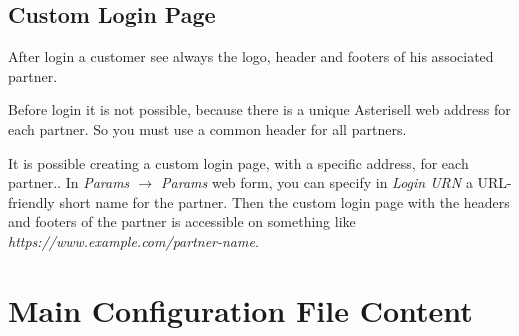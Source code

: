 \documentclass[letterpaper,10pt,english]{sphinxmanual}
\begin{document}
\subsection{Custom Login Page}
\label{index:custom-login-page}
After login a customer see always the logo, header and footers of his associated partner.

Before login it is not possible, because there is a unique Asterisell web address for each partner. So you must use a common header for all partners.

It is possible creating a custom login page, with a specific address, for each partner.. In \emph{Params \(\rightarrow\) Params} web form, you can specify in \emph{Login URN} a URL-friendly short name for the partner. Then the custom login page with the headers and footers of the partner is accessible on something like \emph{https://www.example.com/partner-name}.


\section{Main Configuration File Content}
\label{index:main-configuration-file-content}\label{index:main-configuration-file}
\end{document}
